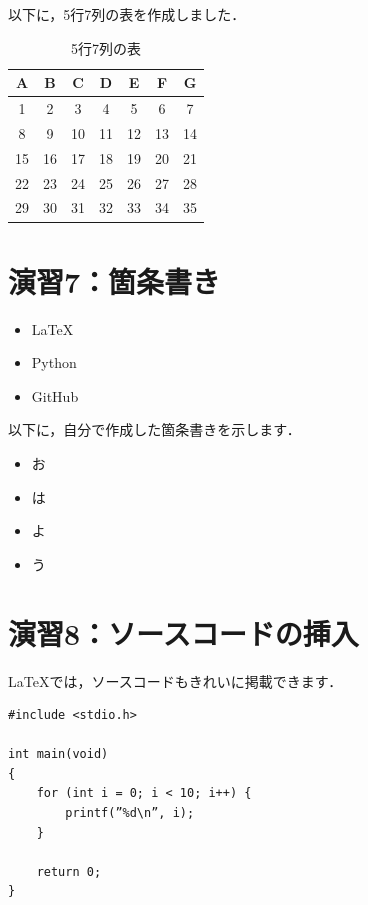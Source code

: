 \documentclass[a4paper,twocolumn]{jsarticle}
\begin{document}
以下に，5行7列の表を作成しました．

\begin{table}[H]
    \centering
    \begin{tabular}{|c|c|c|c|c|c|c|}
        \hline
        A & B & C & D & E & F & G \\
        \hline
        1  & 2  & 3  & 4  & 5  & 6  & 7  \\
        8  & 9  & 10 & 11 & 12 & 13 & 14 \\
        15 & 16 & 17 & 18 & 19 & 20 & 21 \\
        22 & 23 & 24 & 25 & 26 & 27 & 28 \\
        29 & 30 & 31 & 32 & 33 & 34 & 35 \\
        \hline
    \end{tabular}
    \caption{5行7列の表}
    \label{tab:five_by_seven}
\end{table}

\section*{演習7：箇条書き}

\begin{itemize}
    \item LaTeX
    \item Python
    \item GitHub
\end{itemize}

以下に，自分で作成した箇条書きを示します．

\begin{itemize}
    \item お
    \item は
    \item よ
    \item う
\end{itemize}

\section*{演習8：ソースコードの挿入}

LaTeXでは，ソースコードもきれいに掲載できます．

\begin{lstlisting}
#include <stdio.h>

int main(void)
{
    for (int i = 0; i < 10; i++) {
        printf(”%d\n”, i);
    }

    return 0;
}
\end{lstlisting}
\end{document}

